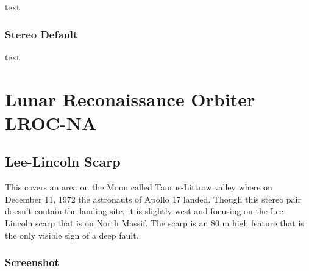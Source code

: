 text

\subsubsection*{Stereo Default}

text

\section{Lunar Reconaissance Orbiter LROC-NA}

\subsection{Lee-Lincoln Scarp}

This covers an area on the Moon called Taurus-Littrow valley where on
December 11, 1972 the astronauts of Apollo 17 landed. Though this
stereo pair doesn't contain the landing site, it is slightly west and
focusing on the Lee-Lincoln scarp that is on North Massif. The scarp
is an 80 m high feature that is the only visible sign of a deep fault.

\subsubsection*{Screenshot}

